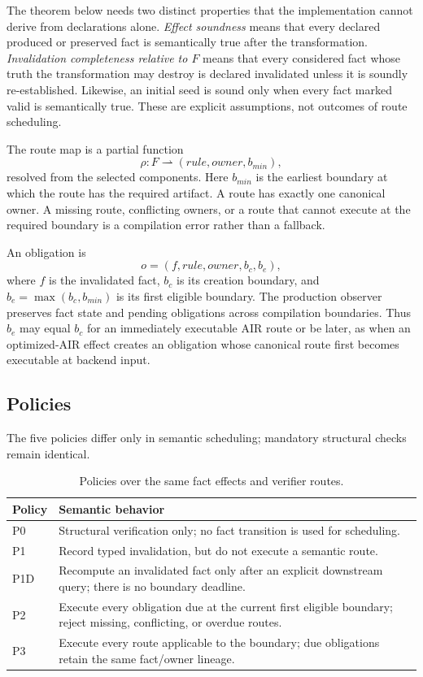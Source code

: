 The theorem below needs two distinct properties that the implementation cannot derive from declarations alone. \emph{Effect soundness} means that every declared produced or preserved fact is semantically true after the transformation. \emph{Invalidation completeness relative to $F$} means that every considered fact whose truth the transformation may destroy is declared invalidated unless it is soundly re-established. Likewise, an initial seed is sound only when every fact marked valid is semantically true. These are explicit assumptions, not outcomes of route scheduling.

The route map is a partial function
\[
 \rho : F \rightharpoonup (rule,owner,b_{min}),
\]
resolved from the selected components. Here $b_{min}$ is the earliest boundary at which the route has the required artifact. A route has exactly one canonical owner. A missing route, conflicting owners, or a route that cannot execute at the required boundary is a compilation error rather than a fallback.

An obligation is
\[
 o=(f,rule,owner,b_c,b_e),
\]
where $f$ is the invalidated fact, $b_c$ is its creation boundary, and $b_e=\max(b_c,b_{min})$ is its first eligible boundary. The production observer preserves fact state and pending obligations across compilation boundaries. Thus $b_e$ may equal $b_c$ for an immediately executable AIR route or be later, as when an optimized-AIR effect creates an obligation whose canonical route first becomes executable at backend input.

\subsection{Policies}
The five policies differ only in semantic scheduling; mandatory structural checks remain identical.

\begin{table}[t]
\caption{Policies over the same fact effects and verifier routes.}
\label{tab:policies}
\small
\begin{tabular}{@{}p{}p{}@{}}
\toprule
Policy & Semantic behavior \\
\midrule
P0 & Structural verification only; no fact transition is used for scheduling. \\
P1 & Record typed invalidation, but do not execute a semantic route. \\
P1D & Recompute an invalidated fact only after an explicit downstream query; there is no boundary deadline. \\
P2 & Execute every obligation due at the current first eligible boundary; reject missing, conflicting, or overdue routes. \\
P3 & Execute every route applicable to the boundary; due obligations retain the same fact/owner lineage. \\
\bottomrule
\end{tabular}
\end{table}

